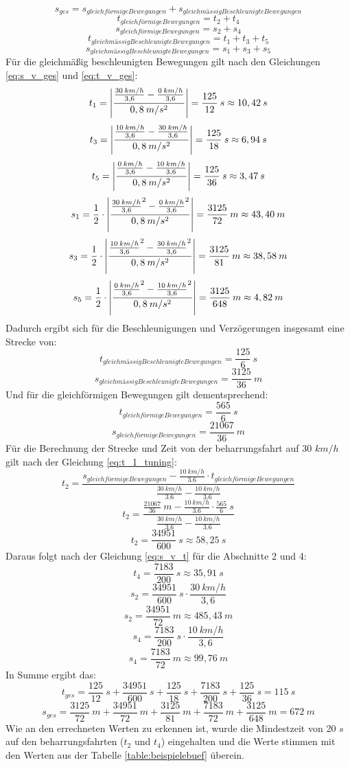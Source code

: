 \[s_{ges} = s_{gleichförmige Bewegungen} + s_{gleichmässig Beschleunigte Bewegungen}\]
\[t_{gleichförmige Bewegungen} = t_2 + t_4\]
\[s_{gleichförmige Bewegungen} = s_2 + s_4\]
\[t_{gleichmässig Beschleunigte Bewegungen} = t_1 + t_3 + t_5\]
\[s_{gleichmässig Beschleunigte Bewegungen} = s_1 + s_3 + s_5\]
Für die gleichmäßig beschleunigten Bewegungen gilt nach den Gleichungen \ref{eq:s_v_ges} und \ref{eq:t_v_ges}:
\[t_1 = \left\vert\frac{\frac{30\:km/h}{3,6}-\frac{0\:km/h}{3,6}}{0,8\:m/s^{2}}\right\vert = \frac{125}{12}\:s \approx 10,42\:s\]
\[t_3 = \left\vert\frac{\frac{10\:km/h}{3,6}-\frac{30\:km/h}{3,6}}{0,8\:m/s^{2}}\right\vert = \frac{125}{18}\:s \approx 6,94\:s\]
\[t_5 = \left\vert\frac{\frac{0\:km/h}{3,6}-\frac{10\:km/h}{3,6}}{0,8\:m/s^{2}}\right\vert = \frac{125}{36}\:s \approx 3,47\:s\]
\[s_1 = \frac{1}{2}\cdot\left\vert\frac{{\frac{30\:km/h}{3,6}}^2-{\frac{0\:km/h}{3,6}}^2}{0,8\:m/s^{2}}\right\vert = \frac{3125}{72}\:m \approx 43,40\:m\]
\[s_3 = \frac{1}{2}\cdot\left\vert\frac{{\frac{10\:km/h}{3,6}}^2-{\frac{30\:km/h}{3,6}}^2}{0,8\:m/s^{2}}\right\vert = \frac{3125}{81}\:m \approx 38,58\:m\]
\[s_5 = \frac{1}{2}\cdot\left\vert\frac{{\frac{0\:km/h}{3,6}}^2-{\frac{10\:km/h}{3,6}}^2}{0,8\:m/s^{2}}\right\vert = \frac{3125}{648}\:m \approx 4,82\:m\]
Dadurch ergibt sich für die Beschleunigungen und Verzögerungen insgesamt eine Strecke von:
\[t_{gleichmässig Beschleunigte Bewegungen} = \frac{125}{6}\:s\]
\[s_{gleichmässig Beschleunigte Bewegungen} = \frac{3125}{36}\:m\]
Und für die gleichförmigen Bewegungen gilt dementsprechend:
\[t_{gleichförmige Bewegungen} = \frac{565}{6}\:s\]
\[s_{gleichförmige Bewegungen} = \frac{21067}{36}\:m\]
Für die Berechnung der Strecke und Zeit von der \Gls{beharrungsfahrt} auf 30 $km/h$ gilt nach der Gleichung \ref{eq:t_1_tuning}:
\[t_{2} = \frac{s_{gleichförmige Bewegungen} - \frac{10\:km/h}{3.6} \cdot t_{gleichförmige Bewegungen}}{\frac{30\:km/h}{3.6} - \frac{10\:km/h}{3.6}}\]
\[t_{2} = \frac{\frac{21067}{36}\:m - \frac{10\:km/h}{3.6} \cdot \frac{565}{6}\:s}{\frac{30\:km/h}{3.6} - \frac{10\:km/h}{3.6}}\]
\[t_{2} = \frac{34951}{600}\:s \approx 58,25\:s\]
Daraus folgt nach der Gleichung \ref{eq:s_v_t} für die Abschnitte 2 und 4:
\[t_{4} = \frac{7183}{200}\:s \approx 35,91\:s\]
\[s_{2} = \frac{34951}{600}\:s \cdot \frac{30\:km/h}{3,6}\]
\[s_{2} = \frac{34951}{72}\:m \approx 485,43\:m\]
\[s_{4} = \frac{7183}{200}\:s \cdot \frac{10\:km/h}{3,6}\]
\[s_{4} = \frac{7183}{72}\:m \approx 99,76\:m\]
In Summe ergibt das:
\[t_{ges} = \frac{125}{12}\:s + \frac{34951}{600}\:s + \frac{125}{18}\:s + \frac{7183}{200}\:s + \frac{125}{36}\:s = 115\:s\]
\[s_{ges} = \frac{3125}{72}\:m + \frac{34951}{72}\:m + \frac{3125}{81}\:m + \frac{7183}{72}\:m + \frac{3125}{648}\:m = 672\:m\]
Wie an den errechneten Werten zu erkennen ist, wurde die Mindestzeit von 20 $s$ auf den \Gls{beharrungsfahrt}en ($t_2$ und $t_4$) eingehalten und die Werte stimmen mit den Werten aus der Tabelle \ref{table:beispielebuef} überein.